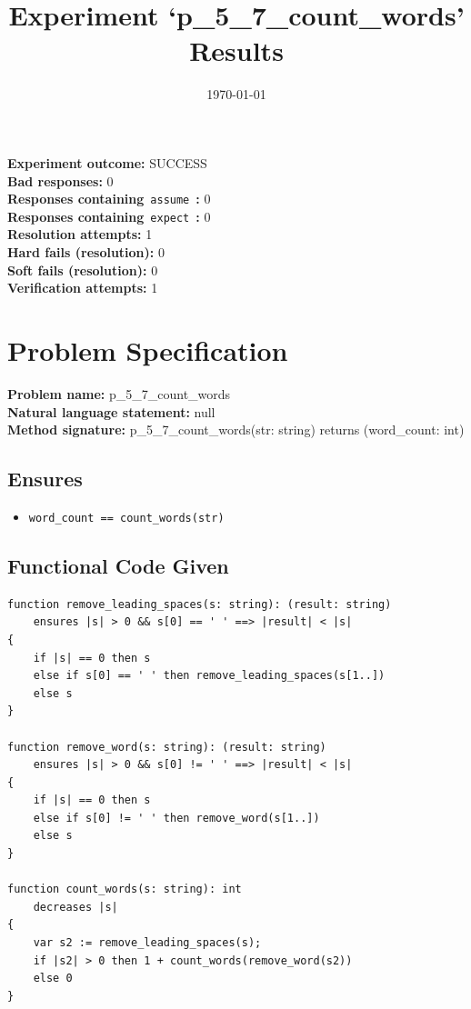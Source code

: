 \documentclass{article}
\begin{document}
\title{Experiment `p\_5\_7\_count\_words' Results}
\author{\today}
\date{}
\maketitle
\textbf{Experiment outcome: }SUCCESS
\\\textbf{Bad responses: }0
\\\textbf{Responses containing}~\texttt{assume}~\textbf{: }0
\\\textbf{Responses containing}~\texttt{expect}~\textbf{: }0
\\\textbf{Resolution attempts: }1
\\\textbf{Hard fails (resolution): }0
\\\textbf{Soft fails (resolution): }0
\\\textbf{Verification attempts: }1
\section*{Problem Specification}
\textbf{Problem name: }p\_5\_7\_count\_words
\\\textbf{Natural language statement: }null
\\\textbf{Method signature: }p\_5\_7\_count\_words(str: string) returns (word\_count: int)
\subsection*{Ensures}
\begin{itemize}
\item \texttt{word\_count == count\_words(str)}
\end{itemize}
\subsection*{Functional Code Given}
\begin{lstlisting}
function remove_leading_spaces(s: string): (result: string)
    ensures |s| > 0 && s[0] == ' ' ==> |result| < |s|
{
    if |s| == 0 then s
    else if s[0] == ' ' then remove_leading_spaces(s[1..])
    else s
}

function remove_word(s: string): (result: string)
    ensures |s| > 0 && s[0] != ' ' ==> |result| < |s|
{
    if |s| == 0 then s
    else if s[0] != ' ' then remove_word(s[1..])
    else s
}

function count_words(s: string): int
    decreases |s|
{
    var s2 := remove_leading_spaces(s);
    if |s2| > 0 then 1 + count_words(remove_word(s2))
    else 0
}
\end{lstlisting}
\clearpage
\end{document}
